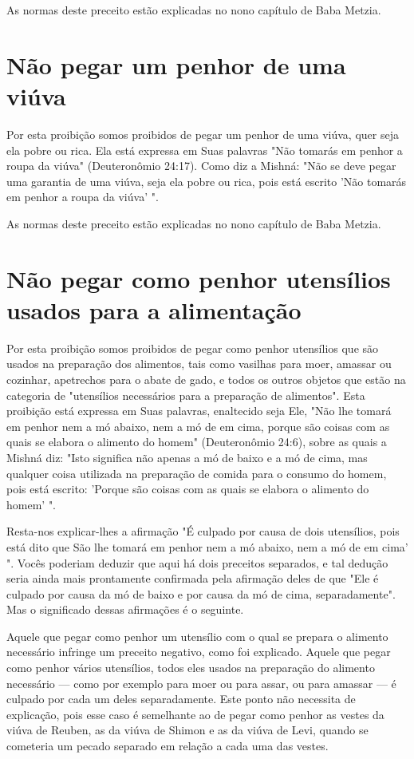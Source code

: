 As normas deste preceito estão explicadas no nono capítulo de Baba
Metzia.

\section{Não pegar um penhor de uma viúva}

Por esta proibição somos proibidos de pegar um penhor de uma viú­va,
quer seja ela pobre ou rica. Ela está expressa em Suas palavras "Não
tomarás em penhor a roupa da viúva" (Deuteronômio 24:17). Como diz a
Mishná: "Não se deve pegar uma garantia de uma viúva, seja ela pobre ou
rica, pois está escri­to 'Não tomarás em penhor a roupa da viúva' ".

As normas deste preceito estão explicadas no nono capítulo de Baba
Metzia.

\section{Não pegar como penhor utensílios usados para a alimentação}

Por esta proibição somos proibidos de pegar como penhor utensí­lios que
são usados na preparação dos alimentos, tais como vasilhas para moer,
amassar ou cozinhar, apetrechos para o abate de gado, e todos os outros
obje­tos que estão na categoria de "utensílios necessários para a
preparação de ali­mentos". Esta proibição está expressa em Suas
palavras, enaltecido seja Ele, "Não lhe tomará em penhor nem a mó
abaixo, nem a mó de em cima, porque são coisas com as quais se elabora o
alimento do homem" (Deuteronômio 24:6), sobre as quais a Mishná diz:
"Isto significa não apenas a mó de baixo e a mó de cima, mas qualquer
coisa utilizada na preparação de comida para o consu­mo do homem, pois
está escrito: 'Porque são coisas com as quais se elabora o alimento do
homem' ".

Resta-nos explicar-lhes a afirmação "É culpado por causa de dois
uten­sílios, pois está dito que São lhe tomará em penhor nem a mó
abaixo, nem a mó de em cima' ". Vocês poderiam deduzir que aqui há dois
preceitos sepa­rados, e tal dedução seria ainda mais prontamente
confirmada pela afirmação deles de que "Ele é culpado por causa da mó de
baixo e por causa da mó de cima, separadamente". Mas o significado
dessas afirmações é o seguinte.

Aquele que pegar como penhor um utensílio com o qual se prepara o
alimento necessário infringe um preceito negativo, como foi explicado.
Aque­le que pegar como penhor vários utensílios, todos eles usados na
preparação do alimento necessário --- como por exemplo para moer ou para
assar, ou para amassar --- é culpado por cada um deles separadamente.
Este ponto não necessita de explicação, pois esse caso é semelhante ao
de pegar como pe­nhor as vestes da viúva de Reuben, as da viúva de
Shimon e as da viúva de Levi, quando se cometeria um pecado separado em
relação a cada uma das vestes.

